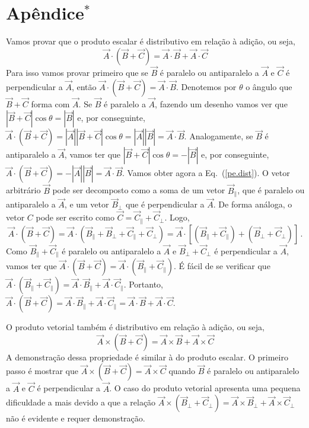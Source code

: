 \documentclass[12pt, a4paper]{article}
\begin{document}
\section*{Apêndice$^*$}
Vamos provar que o produto escalar é distributivo em relação à adição, ou seja, 
\begin{equation}
\label{pe.dist}
\vec A\cdot (\vec B+\vec C)=\vec A\cdot\vec B+\vec A\cdot\vec C
\end{equation}
Para isso vamos provar primeiro que se $\vec B$ é paralelo ou antiparalelo a $\vec A$ e $\vec C$ é per\-pen\-di\-cu\-lar a $\vec A$, então $\vec A\cdot (\vec B+\vec C)=\vec A\cdot\vec B$. Denotemos por $\theta$ o ângulo que $\vec B+\vec C$ forma com $\vec A$. Se $\vec B$ é paralelo a $\vec A$, fazendo um desenho vamos ver que $|\vec B+\vec C|\cos\theta=|\vec B|$ e, por conseguinte, $\vec A\cdot(\vec B+\vec C)=|\vec A||\vec B+\vec C|\cos\theta=|\vec A||\vec B|=\vec A\cdot \vec B$. Analogamente, se $\vec B$ é antiparalelo a $\vec A$, vamos ter que $|\vec B+\vec C|\cos\theta=-|\vec B|$ e, por conseguinte, $\vec A\cdot(\vec B+\vec C)=-|\vec A||\vec B|=\vec A\cdot \vec B$. Vamos obter agora a Eq.~(\ref*{pe.dist}). O vetor arbitrário $\vec B$ pode ser decomposto como a soma de um vetor $\vec B_\parallel$, que é paralelo ou antiparalelo a $\vec A$, e um vetor $\vec B_\perp$ que é perpendicular a $\vec A$. De forma análoga, o vetor $C$ pode ser escrito como $\vec C=\vec C_\parallel+\vec C_\perp$. Logo,
$$\vec A\cdot(\vec B+\vec C)=\vec A\cdot(\vec B_\parallel+\vec B_\perp+\vec C_\parallel+\vec C_\perp)=\vec A\cdot[(\vec B_\parallel+\vec C_\parallel)+(\vec B_\perp+\vec C_\perp)]\,.$$
Como $\vec B_\parallel+\vec C_\parallel$ é paralelo ou antiparalelo a $\vec A$ e $\vec B_\perp+\vec C_\perp$ é perpendicular a $\vec A$, vamos ter que $\vec A\cdot(\vec B+\vec C)=\vec A\cdot(\vec B_\parallel+\vec C_\parallel)$. É fácil de se verificar que $\vec A\cdot(\vec B_\parallel+\vec C_\parallel)=\vec A\cdot\vec B_\parallel+\vec A\cdot\vec C_\parallel$. Portanto, $\vec A\cdot(\vec B+\vec C)=\vec A\cdot\vec B_\parallel+\vec A\cdot\vec C_\parallel=\vec A\cdot\vec B+\vec A\cdot\vec C$.

O produto vetorial também é distributivo em relação à adição, ou seja,
$$\vec A\times(\vec B+\vec C)=\vec A\times\vec B+\vec A\times\vec C$$
A demonstração dessa propriedade é similar à do produto escalar. O primeiro passo é mostrar que $\vec A\times (\vec B+\vec C)=\vec A\times\vec C$ quando $\vec B$ é paralelo ou antiparalelo a $\vec A$ e $\vec C$ é perpendicular a $\vec A$. O caso do produto vetorial apresenta uma pequena dificuldade a mais devido a que a relação $\vec A\times (\vec B_\perp+\vec C_\perp)=\vec A\times \vec B_\perp+\vec A\times\vec C_\perp$ não é evidente e requer demonstração.
\end{document}
